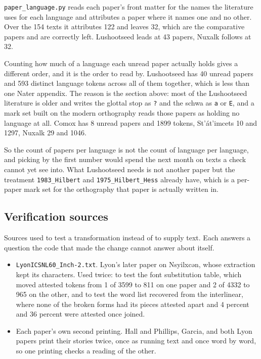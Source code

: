\texttt{paper\_\allowbreak{}language.\allowbreak{}py} reads each paper's front matter for the names the literature uses for each language and attributes a paper where it names one and no other. Over the 154 texts it attributes 122 and leaves 32, which are the comparative papers and are correctly left. Lushootseed leads at 43 papers, Nuxalk follows at 32.

Counting how much of a language each unread paper actually holds gives a different order, and it is the order to read by. Lushootseed has 40 unread papers and 593 distinct language tokens across all of them together, which is less than one Nater appendix. The reason is the section above: most of the Lushootseed literature is older and writes the glottal stop as \texttt{?} and the schwa as \texttt{a} or \texttt{E}, and a mark set built on the modern orthography reads those papers as holding no language at all. Comox has 8 unread papers and 1899 tokens, St'át'imcets 10 and 1297, Nuxalk 29 and 1046.

So the count of papers per language is not the count of language per language, and picking by the first number would spend the next month on texts a check cannot yet see into. What Lushootseed needs is not another paper but the treatment \texttt{1983\_\allowbreak{}Hilbert} and \texttt{1975\_\allowbreak{}Hilbert\_\allowbreak{}Hess} already have, which is a per-paper mark set for the orthography that paper is actually written in.

\subsection{Verification sources}

Sources used to test a transformation instead of to supply text. Each answers a question the code that made the change cannot answer about itself.

\begin{itemize}
\item \texttt{Lyon\allowbreak{}ICSNL60\_\allowbreak{}Inch-\allowbreak{}2.\allowbreak{}txt}. Lyon's later paper on Nsyilxcən, whose extraction kept its characters. Used twice: to test the font substitution table, which moved attested tokens from 1 of 3599 to 811 on one paper and 2 of 4332 to 965 on the other, and to test the word list recovered from the interlinear, where none of the broken forms had its pieces attested apart and 4 percent and 36 percent were attested once joined.
\item Each paper's own second printing. Hall and Phillips, Garcia, and both Lyon papers print their stories twice, once as running text and once word by word, so one printing checks a reading of the other.
\end{itemize}

